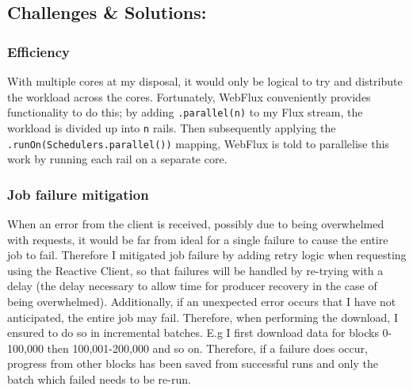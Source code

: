 \subsection{Challenges \& Solutions:}
\subsubsection{Efficiency}
With multiple cores at my disposal, it would only be logical to try and distribute the workload across the cores. Fortunately, WebFlux conveniently provides functionality to do this; by adding \texttt{.parallel(n)} to my Flux stream, the workload is divided up into \texttt{n} rails. Then subsequently applying the \texttt{.runOn(Schedulers.parallel())} mapping, WebFlux is told to parallelise this work by running each rail on a separate core.  

\subsubsection{Job failure mitigation}
When an error from the client is received, possibly due to being overwhelmed with requests, it would be far from ideal for a single failure to cause the entire job to fail. Therefore I mitigated job failure by adding retry logic when requesting using the Reactive Client, so that failures will be handled by re-trying with a delay (the delay necessary to allow time for producer recovery in the case of being overwhelmed). Additionally, if an unexpected error occurs that I have not anticipated, the entire job may fail. Therefore, when performing the download, I ensured to do so in incremental batches. E.g I first download data for blocks 0-100,000 then 100,001-200,000 and so on. Therefore, if a failure does occur, progress from other blocks has been saved from successful runs and only the batch which failed needs to be re-run. 

